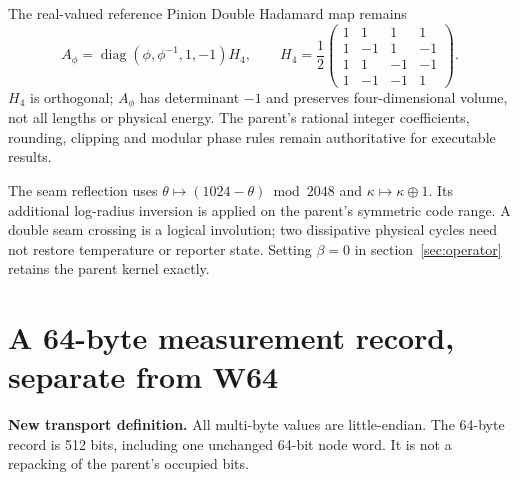 \documentclass[10pt,a4paper]{article}
\numberwithin{equation}{section}
\newcommand{\newpart}{\clearpage}
\DeclareMathOperator{\diag}{diag}
\begin{document}
The real-valued reference Pinion Double Hadamard map remains
\begin{equation}
A_\phi=\diag(\phi,\phi^{-1},1,-1)H_4,\qquad
H_4=\frac12
\begin{pmatrix}1&1&1&1\\1&-1&1&-1\\1&1&-1&-1\\1&-1&-1&1\end{pmatrix}.
\end{equation}
$H_4$ is orthogonal; $A_\phi$ has determinant $-1$ and preserves four-dimensional volume, not all lengths or physical energy. The parent's rational integer coefficients, rounding, clipping and modular phase rules remain authoritative for executable results.

The seam reflection uses $\theta\mapsto(1024-\theta)\bmod2048$ and $\kappa\mapsto\kappa\oplus1$. Its additional log-radius inversion is applied on the parent's symmetric code range. A double seam crossing is a logical involution; two dissipative physical cycles need not restore temperature or reporter state. Setting $\beta=0$ in section~\ref{sec:operator} retains the parent kernel exactly.

\newpart
\section{A 64-byte measurement record, separate from W64}
\label{sec:packet}
\textbf{New transport definition.} All multi-byte values are little-endian. The 64-byte record is 512 bits, including one unchanged 64-bit node word. It is not a repacking of the parent's occupied bits.
\end{document}
